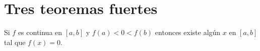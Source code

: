 \chapter{Tres teoremas fuertes}

\begin{tcolorbox}[colframe = white]
    \begin{teo}
	Si $f$ es continua en $[a,b]$ y $f(a)<0<f(b)$ entonces existe algún $x$ en $[a,b]$ tal que $f(x)=0$.
    \end{teo}
\end{tcolorbox}

